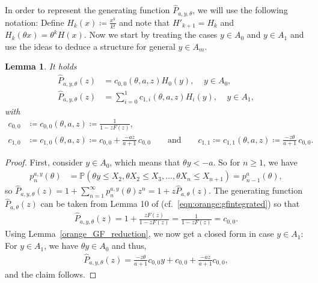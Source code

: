 \documentclass[12pt]{article}
\renewcommand{\P}{\mathbb{P}} %
\newcommand{\1}{\mathds{1}}
\theoremstyle{definition}
\theoremstyle{plain}
\newtheorem{Lemma}[definition]{Lemma}
\theoremstyle{remark}
\begin{document}
In order to represent the generating function $\hat P_{a,y,\theta}$, we will use the following notation: 
Define $H_k(x)\coloneqq \frac{x^k}{k!}$ and note that $H'_{k+1}=H_k$ and $H_k(\theta x)=\theta ^kH(x)$. Now we start by treating the cases $y\in A_0$ and $y\in A_1$ and use the ideas to deduce a structure for general $y\in A_m$.
\begin{Lemma}\label{orange_GF_m=1}
   It holds
    \begin{align*}
        \hat{P}_{a,y,\theta}(z)&=c_{0,0}(\theta,a,z) H_0(y),~~~~~y\in A_0,
\\
        \hat{P}_{a,y,\theta}(z)&=\sum_{i=0}^1c_{1,i}(\theta,a,z)H_i(y),~~~~~y\in A_1,
    \end{align*}
    with \begin{align*}
   c_{0,0}&\coloneqq c_{0,0}(\theta,a,z)\coloneqq \frac{1}{1-zF(z)},
        \\c_{1,0}&\coloneqq c_{1,0}(\theta,a,z)\coloneqq  c_{0,0}+\frac{ -az}{a+1}\,c_{0,0} \qquad\text{and}\qquad
        c_{1,1}\coloneqq c_{1,1}(\theta,a,z)\coloneqq  \frac{- z\theta}{a+1}\,c_{0,0}.
\end{align*}
\end{Lemma}
\begin{proof}
First, consider $y\in A_0$, which means that $\theta y<-a$. So for $n\geq 1$, we have
\begin{align*}
     p_{n}^{a,y}(\theta)
     &=\P(\theta y\leq  X_2,\theta X_2\leq X_3,\dots,\theta X_n\leq X_{n+1}) 
   = p_{n-1}^{a}(\theta),
\end{align*}
so $ \hat{P}_{a,y,\theta}(z)
    =1+\sum_{n=1}^{\infty}p_{n}^{a,y}(\theta)z^n
    =1+z\hat{P}_{a,\theta}(z)$.
The generating function $\hat{P}_{a,\theta}(z)$ can be taken from Lemma 10 of \cite{AurzadaRaschel} (cf.\ \eqref{eqn:orange:gfintegrated}) so that
\begin{align*}
    \hat{P}_{a,y,\theta}(z)=1+\frac{zF(z)}{1-zF(z)}=\frac{1}{1-zF(z)}=c_{0,0}.
\end{align*}
Using Lemma~\ref{orange_GF_reduction}, we now get a closed form in case $y\in A_1$: For $y\in A_1$, we have $\theta y\in A_0$ and thus,
\begin{align*}
    \hat{P}_{a,y,\theta}(z)=\frac{- z\theta}{a+1}c_{0,0} y+c_{0,0}+\frac{ -az}{a+1}c_{0,0},
\end{align*}
and the claim follows. 
\end{proof}
\end{document}
